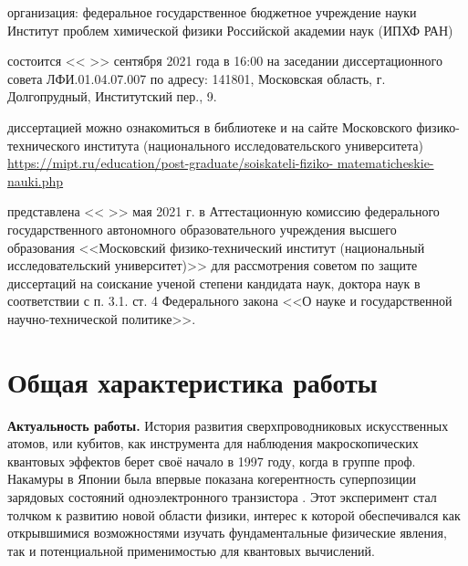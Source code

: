 \documentclass[14pt, a4paper]{extarticle}
\begin{document}
\vspace{1.5cm}
 организация: федеральное государственное бюджетное учреждение науки Институт проблем химической физики Российской академии наук (ИПХФ РАН)

\vspace{1.5cm}
 состоится << >> сентября 2021 года в 16:00 на заседании диссертационного совета ЛФИ.01.04.07.007 по адресу: 141801, Московская область, г. Долгопрудный, Институтский пер., 9.

\vspace{1.5cm}
 диссертацией можно ознакомиться в библиотеке и на сайте Московского физико-технического института (национального исследовательского университета) \url{https://mipt.ru/education/post-graduate/soiskateli-fiziko- matematicheskie-nauki.php}

\vspace{1.5cm}
 представлена << >> мая 2021 г. в Аттестационную комиссию федерального государственного автономного образовательного учреждения высшего образования <<Московский физико-технический институт (национальный исследовательский университет)>> для рассмотрения советом по защите диссертаций на соискание ученой степени кандидата наук, доктора наук в соответствии с п. 3.1. ст. 4 Федерального закона <<О науке и государственной научно-технической политике>>.

\section*{Общая характеристика работы}

\textbf{Актуальность работы.} История развития сверхпроводниковых искусственных атомов, или кубитов, как инструмента для наблюдения макроскопических квантовых эффектов берет своё начало в 1997 году, когда в группе проф. Накамуры в Японии была впервые показана когерентность суперпозиции зарядовых состояний одноэлектронного транзистора \cite{nakamura1997spectroscopy}. Этот эксперимент стал толчком к развитию новой области физики, интерес к которой обеспечивался как открывшимися возможностями изучать фундаментальные физические явления, так и потенциальной применимостью для квантовых вычислений.
\end{document}
